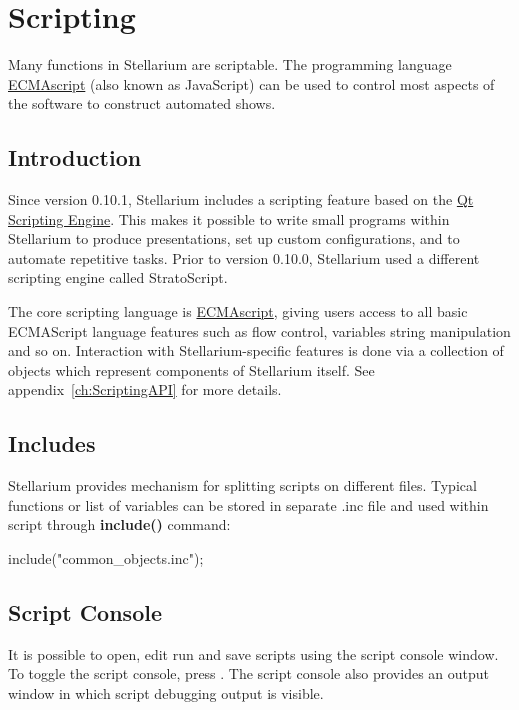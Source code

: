 
\chapter{Scripting}
\label{ch:scripting}

Many functions in Stellarium are scriptable. The programming language
\href{http://en.wikipedia.org/wiki/ECMAScript}{ECMAscript} (also known as JavaScript) can be used to control most
aspects of the software to construct automated shows.

\section{Introduction}
\label{sec:scripting:introduction}

Since version 0.10.1, Stellarium includes a scripting feature based on the \href{http://doc.qt.io/qt-5/qtscript-index.html}{Qt Scripting Engine}. This makes it possible to write small programs within Stellarium to produce presentations, set up custom configurations, and to automate repetitive tasks. Prior to version 0.10.0, Stellarium used a different scripting engine called StratoScript.

The core scripting language is \href{http://en.wikipedia.org/wiki/ECMAScript}{ECMAscript}, giving users access to all basic ECMAScript language features such as flow control, variables string manipulation and so on. Interaction with Stellarium-specific features is done via a collection of objects which represent components of Stellarium itself. See appendix~\ref{ch:ScriptingAPI} for more details.

\section{Includes}
\label{sec:scripting:includes}

Stellarium provides mechanism for splitting scripts on different files. Typical functions or list of variables can be stored in separate .inc file and used within script through \textbf{include()} command:
\begin{script}
include("common_objects.inc");
\end{script}

\section{Script Console}
\label{sec:scripting:console}
It is possible to open, edit run and save scripts using the script console window. To toggle the script console, press . The script console also provides an output window in which script debugging output is visible.

